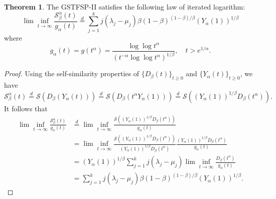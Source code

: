 \documentclass[11pt,oneside,reqno]{amsart}
\theoremstyle{definition}
\newtheorem{theorem}{\bf Theorem}[section]
\newtheorem{corollary}{Corollary}[section]
\theoremstyle{remarkstyle}
\begin{document}

\begin{theorem}\label{lil.GSTFSP-II}
The GSTFSP-II satisfies the following law of iterated logarithm:
\begin{equation*}
\lim\inf_{t\rightarrow\infty}\frac{\mathcal{S}_{\beta}^{\alpha}(t)}{g_{\alpha}(t)} \overset{d}{=} \sum_{j=1}^kj(\lambda_j-\mu_j)\beta(1-\beta)^{(1-\beta)/\beta}(Y_\alpha(1))^{1/\beta}     
\end{equation*}
where
\begin{equation*}
g_{\alpha}(t)=g(t^{\alpha})=\frac{\log\log t^{\alpha}}{(t^{-\alpha}\log\log t^{\alpha})^{1/\beta}},\quad t>e^{1/\alpha}.
\end{equation*}
\end{theorem}

\begin{proof}
Using the self-similarity properties of $\{D_{\beta}(t)\}_{t\ge 0}$ and $\{Y_{\alpha}(t)\}_{t\ge 0}$, we have 
\begin{equation}\label{GSTFSP-II.self-similarity} \mathcal{S}_{\beta}^\alpha(t)\overset{d}{=}\mathcal{S}(D_\beta(Y_\alpha(t)))\overset{d}{=}\mathcal{S}(D_\beta(t^\alpha Y_\alpha(1)))\overset{d}{=}\mathcal{S}((Y_\alpha(1))^{1/\beta}D_\beta(t^{\alpha})).
\end{equation}
It follows that
\begin{align*}
\lim\inf_{t\rightarrow\infty}\frac{\mathcal{S}_{\beta}^{\alpha}(t)}{g_{\alpha}(t)} &\overset{d}{=} \lim\inf_{t\rightarrow\infty}\frac{\mathcal{S}((Y_\alpha(1))^{1/\beta}D_\beta(t^{\alpha}))}{g_{\alpha}(t)} \nonumber \\
&=\lim\inf_{t\rightarrow \infty}\frac{\mathcal{S}((Y_\alpha(1))^{1/\beta}D_\beta(t^{\alpha}))}{(Y_\alpha(1))^{1/\beta}D_\beta(t^{\alpha})}\frac{(Y_\alpha(1))^{1/\beta}D_\beta(t^{\alpha})}{g_{\alpha}(t)}\nonumber\\
&=(Y_\alpha(1))^{1/\beta}\sum_{j=1}^kj(\lambda_j-\mu_j)\lim\inf_{t\rightarrow \infty}\frac{D_\beta(t^{\alpha})}{g_{\alpha}(t)} \nonumber \\
&=\sum_{j=1}^kj(\lambda_j-\mu_j)\beta(1-\beta)^{(1-\beta)/\beta}(Y_\alpha(1))^{1/\beta}.
\end{align*}
\end{proof}
\end{document}
